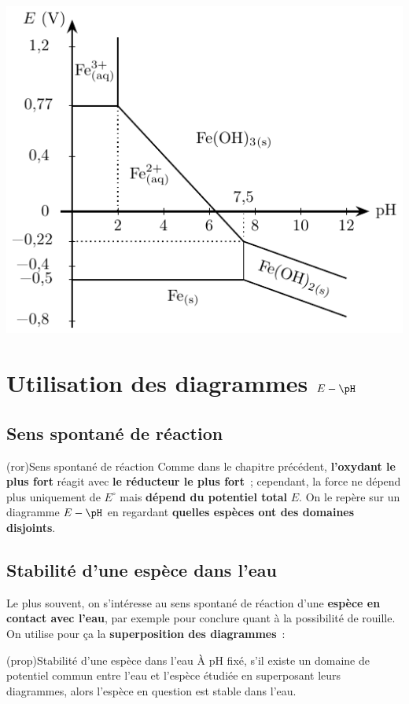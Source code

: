 \documentclass[../../main/main.tex]{subfiles}
\begin{document}
\begin{tcb*}[breakable]
\begin{center}
{    }{
      \includegraphics[width=.8\linewidth]{eph_fer}
    }
  \end{center}
\end{tcb*}

\section{Utilisation des diagrammes $E-\pH$}
\label{sec:util}

\subsection{Sens spontané de réaction}
\begin{tcb*}(ror){Sens spontané de réaction}
	Comme dans le chapitre précédent, \textbf{l'oxydant le plus fort} réagit avec
	\textbf{le réducteur le plus fort}~; cependant, la force ne dépend plus
	uniquement de $E^\circ$ mais \textbf{dépend du potentiel total} $E$.
	\smallbreak
	On le repère sur un diagramme $E-\pH$ en regardant \textbf{quelles espèces ont
		des domaines disjoints}.
\end{tcb*}

\subsection{Stabilité d'une espèce dans l'eau}
Le plus souvent, on s'intéresse au sens spontané de réaction d'une
\textbf{espèce en contact avec l'eau}, par exemple pour conclure quant à la
possibilité de rouille. On utilise pour ça la \textbf{superposition des
	diagrammes}~:
\begin{tcb*}(prop){Stabilité d'une espèce dans l'eau}
	À pH fixé, s'il existe un domaine de potentiel commun entre l'eau et l'espèce
	étudiée en superposant leurs diagrammes, alors l'espèce en question est stable
	dans l'eau.
\end{tcb*}
\end{document}
